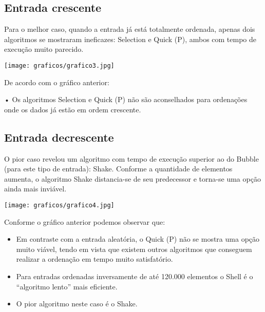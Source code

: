 \documentclass[12pt,a4paper]{article}
\begin{document}
\subsection{Entrada crescente}
Para o melhor caso, quando a entrada já está totalmente ordenada, apenas dois algoritmos se mostraram ineficazes: Selection e Quick (P), ambos com tempo de execução muito parecido.





\begin{center}
\texttt{[image: graficos/grafico3.jpg]}
\end{center}




De acordo com o gráfico anterior:

•	Os algoritmos Selection e Quick (P) não são aconselhados para ordenações onde os dados já estão em ordem crescente.






\subsection{Entrada decrescente}
O pior caso revelou um algoritmo com tempo de execução superior ao do Bubble (para este tipo de entrada): Shake. Conforme a quantidade de elementos aumenta, o algoritmo Shake distancia-se de seu predecessor e torna-se uma opção ainda mais inviável.





\begin{center}
\texttt{[image: graficos/grafico4.jpg]}
\end{center}



Conforme o gráfico anterior podemos observar que:
\begin{itemize}
\item Em contraste com a entrada aleatória, o Quick (P) não se mostra uma opção muito viável, tendo em vista que existem outros algoritmos que conseguem realizar a ordenação em tempo muito satisfatório.
\item Para entradas ordenadas inversamente de até 120.000 elementos o Shell é o “algoritmo lento” mais eficiente.
\item O pior algoritmo neste caso é o Shake.
\end{itemize}
\end{document}
